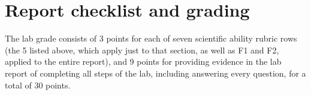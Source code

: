 \section{Report checklist and grading}

The lab grade consists of 3 points for each of seven scientific ability rubric rows (the 5 listed above, which apply just to that section, as well as F1 and F2, applied to the entire report), and 9 points for providing evidence in the lab report of completing all steps of the lab, including answering every question, for a total of 30 points.